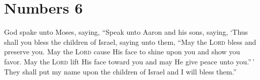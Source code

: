 \section{Numbers 6}\label{Numbers 6}
\begin{enumerate}
     God spake unto Moses, saying,%
     ``Speak unto Aaron and his sons, saying, `Thus shall you bless the children of Israel, saying unto them,%
     ``May the \textsc{Lord} bless and preserve you.%
     May the \textsc{Lord} cause His face to shine upon you and show you favor.%
     May the \textsc{Lord} lift His face toward you and may He give peace unto you.''\,'%
     They shall put my name upon the children of Israel and I will bless them.''%
\end{enumerate}
